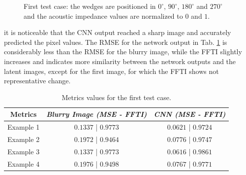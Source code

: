 \documentclass[conference]{IEEEtran}
\begin{document}
\begin{figure}[!t]
{\label{fig_second_case_cnn}}
\caption{First test case: the wedges are positioned in 
$0^{\circ}$, $90^{\circ}$, $180^{\circ}$ and $270^{\circ}$ and the acoustic impedance values are normalized to $0$ and $1$.}
\label{fig_scenario1}
\end{figure}
it is noticeable that the CNN output reached a sharp image and accurately
predicted the pixel values. The RMSE for the network output in Tab. \ref{table_caso_1} is considerably less than the RMSE for the blurry image,
while the FFTI slightly increases and indicates more similarity between the network outputs
and the latent images, except for the first image, for which the FFTI shows not representative change.
\begin{table}[!t]
\renewcommand{\arraystretch}{1.2}
\caption{Metrics values for the first test case.}
\label{table_caso_1}
\centering
\begin{tabular}{|c||c||c|}
\hline
 \textbf{Metrics} & \textbf{\textit{Blurry Image (MSE - FFTI)}} & \textbf{\textit{CNN (MSE - FFTI)}}\\
\hline
Example 1 & $0.1337$ | $0.9773$ & $0.0621$ | $0.9724$\\
\hline
Example 2 & $0.1972$ | $0.9464$ & $0.0776$ | $0.9747$\\
\hline
Example 3 & $0.1337$ | $0.9773$ & $0.0616$ | $0.9861$\\
\hline
Example 4 & $0.1976$ | $0.9498$ & $0.0767$ | $0.9771$\\
\hline
\end{tabular}
\end{table}
\end{document}
